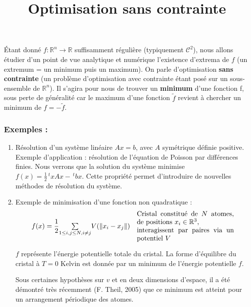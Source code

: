 \documentclass[a4paper,11pt]{article}
\title{\huge \bfseries Optimisation sans contrainte}
\date{}
\author{}
\newcommand{\R}{\mathbb{R}}
\newcommand{\norm}[1]{\left\lVert#1\right\rVert}
\newcommand{\tpo}[1]{\,^t#1}
\theoremstyle{plain} %
\begin{document}
\maketitle

Étant donné $f : \R^n \longrightarrow \R$ suffisamment régulière (typiquement
$\mathcal{C}^2$), nous allons étudier d'un point de vue analytique et
numérique l'existence d'extrema de $f$ (un extremum = un minimum puis un
maximum). On parle d'optimisation \textbf{sans contrainte} (un problème 
d'optimisation avec contrainte étant posé sur un sous-ensemble de $\R^n$).
Il s'agira pour nous de trouver un \textbf{minimum} d'une fonction f, sous perte
de généralité car le maximum d'une fonction $\tilde{f}$ revient à chercher
un minimum de $f = - \tilde{f}$.

\subsubsection*{Exemples :}

\begin{enumerate}[label=-]
    \item Résolution d'un système linéaire $Ax=b$, avec $A$ symétrique définie
        positive. Exemple d'application : résolution de l'équation de Poisson
        par différences finies. Nous verrons que la solution du système
        minimise $f(x) = \frac{1}{2} \tpo{x}Ax - \tpo{b}x$. Cette propriété
        permet d'introduire de nouvelles méthodes de résolution du système.

    \item Exemple de minimisation d'une fonction non quadratique :
        \[
            \begin{array}{cc}
                f(x) = \dfrac{1}{2} \underset{1\leq i,j\leq N, i\ne j}{\sum} V(\norm{x_i - x_j}) 
                & 
                \parbox{5cm}{Cristal constitué de $N$ atomes, de positions $x_i \in \R^3$,\\ interagissent par paires via un potentiel $V$}
            \end{array}
        \]
        
        $f$ représente l'énergie potentielle totale du cristal. La forme d'équilibre du
        cristal à $T = 0$ Kelvin est donnée par un minimum de l'énergie potentielle $f$.

        Sous certaines hypothèses sur $v$ et en deux dimensions d'espace, il a été démontré
        très récemment (F. Theil, 2005) que ce minimum est atteint pour un arrangement
        périodique des atomes.
\end{enumerate}
\end{document}

